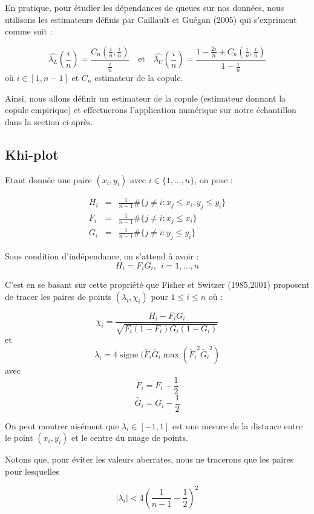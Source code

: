 En pratique, pour étudier les dépendances de queues sur nos données, nous utilisons les estimateurs définis par Caillault et Guégan
(2005) qui s'expriment comme suit :

$$
\widehat{\lambda_L}\left(\frac{i}{n}\right) = \frac{C_n(\frac{i}{n},\frac{i}{n})}{\frac{i}{n}}    \text{~~~et~~~} 
\widehat{\lambda_U}\left(\frac{i}{n}\right) = \frac{1-\frac{2i}{n} + C_n(\frac{i}{n},\frac{i}{n})}{ 1 - \frac{i}{n}}
$$
où $i \in [1,n-1]$ et $C_n$ estimateur de la copule.

Ainsi, nous allons définir un estimateur de la copule (estimateur donnant la copule empirique) et effectuerons l'application numérique sur notre échantillon 
dans la section ci-après.

\subsection{Khi-plot}

Etant donnée une paire $(x_i,y_i)$ avec $i \in \{1,...,n\}$, on pose :

\begin{eqnarray*}
H_i &=& \frac{1}{n-1} \# \{j \neq i : x_j \leq x_i , y_j \leq y_i \} \\
F_i &=& \frac{1}{n-1} \# \{j \neq i : x_j \leq x_i \} \\
G_i &=& \frac{1}{n-1} \# \{j \neq i : y_j \leq y_i \} 
\end{eqnarray*}

Sous condition d'indépendance, on s'attend à avoir :
$$
H_i = F_i G_i, ~~i=1,...,n
$$

C'est en se basant sur cette propriété que Fisher et Switzer (1985,2001) proposent de tracer les paires de points $(\lambda_i,\chi_i)$ pour $1\leq i \leq n$ où :

$$
\chi_i = \frac{H_i-F_i G_i}{\sqrt{F_i(1-F_i)G_i(1-G_i)}}
$$
et
$$
\lambda_i = 4 \operatorname{signe}( \widetilde{F_i} \widetilde{G_i} \operatorname{max}(\widetilde{F_i}^2 \widetilde{G_i}^2  )
$$
avec
$$
\widetilde{F_i} = F_i - \frac{1}{2}
$$
$$
\widetilde{G_i} = G_i - \frac{1}{2}
$$

On peut montrer aisément que $\lambda_i \in [-1,1]$ est une mesure de la distance entre le point $(x_i,y_i)$ et le centre du nuage de points.

Notons que, pour éviter les valeurs aberrates, nous ne tracerons que les paires pour lesquelles 

$$
|\lambda_i| < 4 \left(  \frac{1}{n-1} -\frac{1}{2} \right)^2
$$

